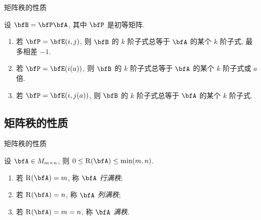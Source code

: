 \begin{frame}{矩阵秩的性质}
	\onslide<+->
	\begin{proof*}
		设 $\bfB=\bfP\bfA$, 其中 $\bfP$ 是初等矩阵.
		\begin{enumerate}
			\item 若 $\bfP=\bfE(i,j)$, 则 $\bfB$ 的 $k$ 阶子式总等于 $\bfA$ 的某个 $k$ 阶子式, 最多相差 $-1$.
			\item 若 $\bfP=\bfE(i(a))$, 则 $\bfB$ 的 $k$ 阶子式总等于 $\bfA$ 的某个 $k$ 阶子式或 $a$ 倍.
			\item 若 $\bfP=\bfE(i,j(a))$, 则 $\bfB$ 的 $k$ 阶子式总等于 $\bfA$ 的某个 $k$ 阶子式.
		\end{enumerate}


	\end{proof*}
\end{frame}


\subsection{矩阵秩的性质}

\begin{frame}{矩阵秩的性质}
	\onslide<+->
	\begin{proposition}
		设 $\bfA\in M_{m\times n}$, 则 $0\le \rank(\bfA)\le \min(m,n)$.
	\end{proposition}
	\onslide<+->
	\begin{definition}
		\begin{enumerate}
			\item 若 $\rank(\bfA)=m$, 称 $\bfA$ \emph{行满秩};
			\item 若 $\rank(\bfA)=n$, 称 $\bfA$ \emph{列满秩};
			\item 若 $\rank(\bfA)=m=n$, 称 $\bfA$ \emph{满秩}.
		\end{enumerate}
	\end{definition}
\end{frame}


